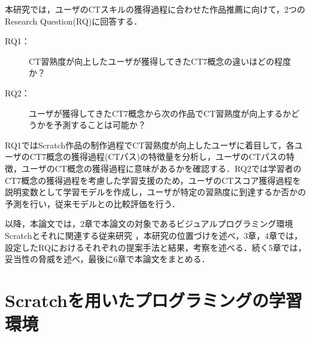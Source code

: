 \documentclass[11pt,dvipdfmx]{jreport}
\begin{document}
本研究では，ユーザのCTスキルの獲得過程に合わせた作品推薦に向けて，2つのResearch Question(RQ)に回答する．

\begin{description}
\item [RQ1：]CT習熟度が向上したユーザが獲得してきたCT7概念の違いはどの程度か？
\item [RQ2：]ユーザが獲得してきたCT7概念から次の作品でCT習熟度が向上するかどうかを予測することは可能か？
\end{description}

RQ1ではScratch作品の制作過程でCT習熟度が向上したユーザに着目して，各ユーザのCT7概念の獲得過程(CTパス)の特徴量を分析し，ユーザのCTパスの特徴，ユーザのCT概念の獲得過程に意味があるかを確認する．RQ2では学習者のCT7概念の獲得過程を考慮した学習支援のため，ユーザのCTスコア獲得過程を説明変数として学習モデルを作成し，ユーザが特定の習熟度に到達するか否かの予測を行い，従来モデルとの比較評価を行う．

以降，本論文では，2章で本論文の対象であるビジュアルプログラミング環境Scratchとそれに関連する従来研究
，本研究の位置づけを述べ，3章，4章では，設定したRQにおけるそれぞれの提案手法と結果，考察を述べる．続く5章では，妥当性の脅威を述べ，最後に6章で本論文をまとめる．


\chapter{Scratchを用いたプログラミングの学習環境}
\end{document}
